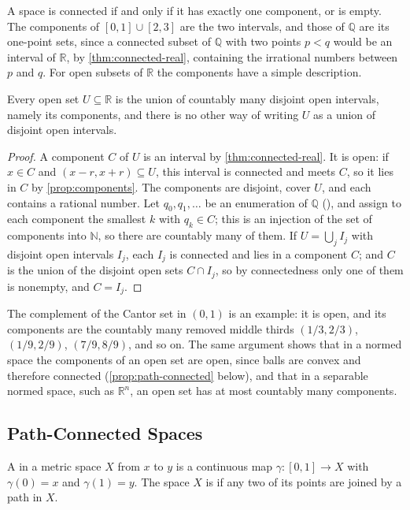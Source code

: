 A space is connected if and only if it has exactly one component, or is empty. The components of $[0,1]\cup[2,3]$ are the two intervals, and those of $\mathbb Q$ are its one-point sets, since a connected subset of $\mathbb Q$ with two points $p<q$ would be an interval of $\mathbb R$, by \cref{thm:connected-real}, containing the irrational numbers between $p$ and $q$. For open subsets of $\mathbb R$ the components have a simple description.

\begin{theorem}
\label{thm:open-sets-real}
Every open set $U\subseteq\mathbb R$ is the union of countably many disjoint open intervals, namely its components, and there is no other way of writing $U$ as a union of disjoint open intervals.
\end{theorem}

\begin{proof}
A component $C$ of $U$ is an interval by \cref{thm:connected-real}. It is open: if $x\in C$ and $(x-r,x+r)\subseteq U$, this interval is connected and meets $C$, so it lies in $C$ by \cref{prop:components}. The components are disjoint, cover $U$, and each contains a rational number. Let $q_0,q_1,\ldots$ be an enumeration of $\mathbb Q$ (), and assign to each component the smallest $k$ with $q_k\in C$; this is an injection of the set of components into $\mathbb N$, so there are countably many of them. If $U=\bigcup_jI_j$ with disjoint open intervals $I_j$, each $I_j$ is connected and lies in a component $C$; and $C$ is the union of the disjoint open sets $C\cap I_j$, so by connectedness only one of them is nonempty, and $C=I_j$.
\end{proof}

The complement of the Cantor set in $(0,1)$ is an example: it is open, and its components are the countably many removed middle thirds $(1/3,2/3)$, $(1/9,2/9)$, $(7/9,8/9)$, and so on. The same argument shows that in a normed space the components of an open set are open, since balls are convex and therefore connected (\cref{prop:path-connected} below), and that in a separable normed space, such as $\mathbb R^n$, an open set has at most countably many components.

\subsection{Path-Connected Spaces}

\begin{definition}
\label{def:path-connected}
A  in a metric space $X$ from $x$ to $y$ is a continuous map $\gamma\colon[0,1]\to X$ with $\gamma(0)=x$ and $\gamma(1)=y$. The space $X$ is  if any two of its points are joined by a path in $X$.
\end{definition}

